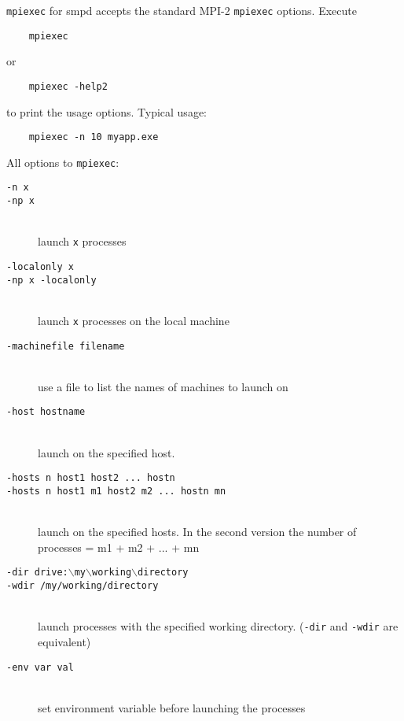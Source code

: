 \documentclass[dvipdfm,11pt]{article}
\begin{document}
\texttt{mpiexec} for smpd accepts the standard MPI-2 \texttt{mpiexec}
options.  Execute
\begin{verbatim}
    mpiexec
\end{verbatim}
or
\begin{verbatim}
    mpiexec -help2
\end{verbatim}
to print the usage options.  Typical usage:
\begin{verbatim}
    mpiexec -n 10 myapp.exe
\end{verbatim}
All options to \texttt{mpiexec}:
\begin{description}
\item[\texttt{-n x}]
\item[\texttt{-np x}]\mbox{}\\
  launch \texttt{x} processes
\item[\texttt{-localonly x}]
\item[\texttt{-np x -localonly}]\mbox{}\\
  launch \texttt{x} processes on the local machine
\item[\texttt{-machinefile filename}]\mbox{}\\
  use a file to list the names of machines to launch on
\item[\texttt{-host hostname}]\mbox{}\\
  launch on the specified host.
\item[\texttt{-hosts n host1 host2 ... hostn}]
\item[\texttt{-hosts n host1 m1 host2 m2 ... hostn mn}]\mbox{}\\
  launch on the specified hosts.
  In the second version the number of processes = m1 + m2 + ... + mn
\item[\texttt{-dir drive:$\backslash$my$\backslash$working$\backslash$directory}]
\item[\texttt{-wdir /my/working/directory}]\mbox{}\\
  launch processes with the specified working directory. (\texttt{-dir}
  and \texttt{-wdir} are equivalent)
\item[\texttt{-env var val}]\mbox{}\\
  set environment variable before launching the processes

\end{description}
\end{document}

